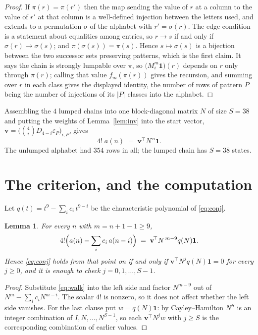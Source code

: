 \documentclass[11pt,a4paper]{article}
\theoremstyle{plain}
\newtheorem{lemma}[theorem]{Lemma}
\theoremstyle{definition}
\begin{document}
\begin{proof}
If $\pi(r)=\pi(r')$ then the map sending the value of $r$ at a column to the value of $r'$
at that column is a well-defined injection between the letters used, and extends to a
permutation $\sigma$ of the alphabet with $r'=\sigma(r)$. The edge condition is a statement
about equalities among entries, so $r\to s$ if and only if $\sigma(r)\to\sigma(s)$; and
$\pi(\sigma(s))=\pi(s)$. Hence $s\mapsto\sigma(s)$ is a bijection between the two successor
sets preserving patterns, which is the first claim. It says the chain is strongly lumpable
over $\pi$, so $\bigl(M_i^{m}\mathbf{1}\bigr)(r)$ depends on $r$ only through $\pi(r)$;
calling that value $f_m(\pi(r))$ gives the recursion, and summing over $r$ in each class
gives the displayed identity, the number of rows of pattern $P$ being the number of
injections of its $|P|$ classes into the alphabet.
\end{proof}

Assembling the $4$ lumped chains into one block-diagonal matrix $N$ of size $S=38$ and
putting the weights of Lemma~\ref{lem:inv} into the start vector,
$\mathbf{v}=\bigl(\binom{4}{i}D_{4-i}\varepsilon_P\bigr)_{i,P}$, gives
\begin{equation}\label{eq:walk}
4!\;a(n)\;=\;\mathbf{v}^{\!\top}N^{\,n}\mathbf{1} .
\end{equation}
The unlumped alphabet had $354$ rows in all; the lumped chain has $S=38$ states.

\section{The criterion, and the computation}

Let $q(t)=t^{9}-\sum_i c_i\,t^{9-i}$ be the characteristic polynomial of
\eqref{eq:conj}.

\begin{lemma}\label{lem:crit}
For every $n$ with $m=n+1-1\ge9$,
\[
4!\Bigl(a(n)-\sum_i c_i\,a(n-i)\Bigr)\;=\;\mathbf{v}^{\!\top}N^{\,m-9}q(N)\mathbf{1} .
\]
Hence \eqref{eq:conj} holds from that point on if and only if
$\mathbf{v}^{\!\top}N^{j}q(N)\mathbf{1}=0$ for every $j\ge0$, and it is enough to check
$j=0,1,\dots,S-1$.
\end{lemma}

\begin{proof}
Substitute \eqref{eq:walk} into the left side and factor $N^{m-9}$ out of
$N^{m}-\sum_i c_iN^{m-i}$. The scalar $4!$ is nonzero, so it does not affect whether
the left side vanishes. For the last clause put $w=q(N)\mathbf{1}$: by Cayley--Hamilton
$N^{S}$ is an integer combination of $I,N,\dots,N^{S-1}$, so each
$\mathbf{v}^{\!\top}N^{j}w$ with $j\ge S$ is the corresponding combination of earlier
values.
\end{proof}
\end{document}
